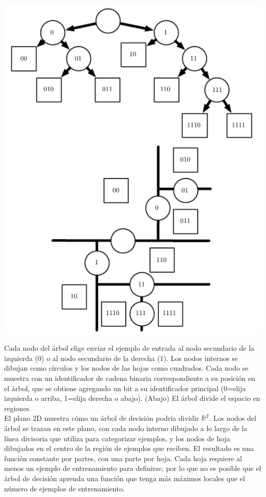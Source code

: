 \begin{center}
    \includegraphics[scale = .7]{IMA/treedesc.png}
\end{center}

Cada nodo del árbol elige enviar el ejemplo de entrada al nodo secundario de la izquierda 
(0) o al nodo secundario de la derecha (1). Los nodos internos se dibujan como círculos y 
los nodos de las hojas como cuadrados. Cada nodo se muestra con un identificador de cadena 
binaria correspondiente a su posición en el árbol, que se obtiene agregando un bit a su 
identificador principal (0=elija izquierda o arriba, 1=elija derecha o abajo). (Abajo) 
El árbol divide el espacio en regiones. \\ 

El plano 2D muestra cómo un árbol de decisión podría 
dividir $\mathbb{R}^{2}$. Los nodos del árbol se trazan en este plano, con cada nodo interno 
dibujado a lo largo de la línea divisoria que utiliza para categorizar ejemplos, y los 
nodos de hoja dibujados en el centro de la región de ejemplos que reciben. El resultado es 
una función constante por partes, con una parte por hoja. Cada hoja requiere al menos un 
ejemplo de entrenamiento para definirse, por lo que no es posible que el árbol de decisión 
aprenda una función que tenga más máximos locales que el número de ejemplos de 
entrenamiento. \cite{Goodfellow-et-al-2016}


